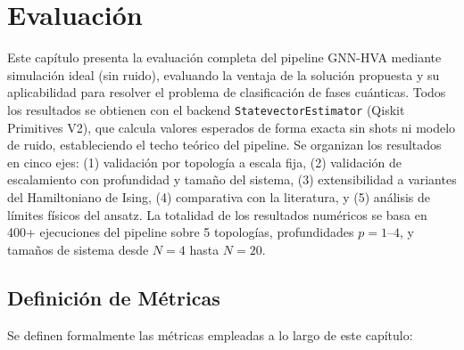 \documentclass[11pt,a4paper,spanish]{book}
\begin{document}

\chapter{Evaluación}

Este capítulo presenta la evaluación completa del pipeline GNN-HVA mediante simulación ideal (sin ruido), evaluando la ventaja de la solución propuesta y su aplicabilidad para resolver el problema de clasificación de fases cuánticas. Todos los resultados se obtienen con el backend \texttt{StatevectorEstimator} (Qiskit Primitives V2), que calcula valores esperados de forma exacta sin shots ni modelo de ruido, estableciendo el techo teórico del pipeline. Se organizan los resultados en cinco ejes: (1) validación por topología a escala fija, (2) validación de escalamiento con profundidad y tamaño del sistema, (3) extensibilidad a variantes del Hamiltoniano de Ising, (4) comparativa con la literatura, y (5) análisis de límites físicos del ansatz. La totalidad de los resultados numéricos se basa en 400+ ejecuciones del pipeline sobre 5 topologías, profundidades $p = 1$--$4$, y tamaños de sistema desde $N = 4$ hasta $N = 20$.

\section{Definición de Métricas}

Se definen formalmente las métricas empleadas a lo largo de este capítulo:
\end{document}
